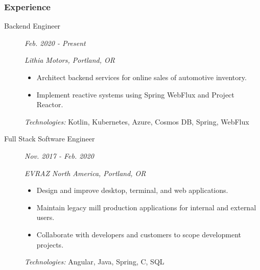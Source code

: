 \documentclass{article}
\begin{document}

\subsubsection*{Experience}

    \begin{description}
		
	\item[Backend Engineer] \hfill \textit{Feb. 2020 - Present}
		
        \textit{Lithia Motors, Portland, OR}
        \begin{itemize}     
        \item Architect backend services for online sales of automotive inventory.
        \item Implement reactive systems using Spring WebFlux and Project Reactor.
          
        \end{itemize}
        \textit{Technologies:} Kotlin, Kubernetes, Azure, Cosmos DB, Spring, WebFlux
		\vspace{0.5em}

	\item[Full Stack Software Engineer] \hfill \textit{Nov. 2017 - Feb. 2020}
		
        \textit{EVRAZ North America, Portland, OR}
        \begin{itemize}     
            \item Design and improve desktop, terminal, and web applications.
            \item Maintain legacy mill production applications for internal and external users.
            \item Collaborate with developers and customers to scope development projects.
        \end{itemize}
        \textit{Technologies:} Angular, Java, Spring, C, SQL
        
    \end{description}

\end{document}
